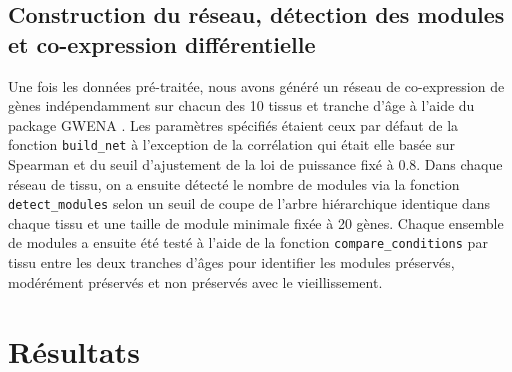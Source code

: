 


\subsection{Construction du réseau, détection des modules et co-expression différentielle}

Une fois les données pré-traitée, nous avons généré un réseau de co-expression de gènes indépendamment sur chacun des 10 tissus et tranche d'âge à l'aide du package GWENA . Les paramètres spécifiés étaient ceux par défaut de la fonction \verb+build_net+ à l'exception de la corrélation qui était elle basée sur Spearman et du seuil d'ajustement de la loi de puissance fixé à 0.8. Dans chaque réseau de tissu, on a ensuite détecté le nombre de modules via la fonction \verb+detect_modules+ selon un seuil de coupe de l'arbre hiérarchique identique dans chaque tissu et une taille de module minimale fixée à 20 gènes. Chaque ensemble de modules a ensuite été testé à l'aide de la fonction \verb+compare_conditions+ par tissu entre les deux tranches d'âges pour identifier les modules préservés, modérément préservés et non préservés avec le vieillissement.






\section{Résultats}


